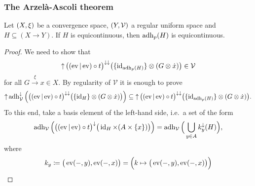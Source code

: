 \subsubsection{The Arzelà-Ascoli theorem}
\begin{lemma}
Let $\left( X,\xi \right)$ be a convergence space, $\left( Y, \mathcal{V} \right)$ a regular uniform space and $H \subseteq (X\to Y)$. If $H$ is equicontinuous, then $\operatorname{adh}_p(H)$ is equicontinuous.
\end{lemma}
\begin{proof}
We need to show that
\[ \operatorname{\uparrow}\big((\operatorname{ev}|\operatorname{ev})\circ t\big)^{\downarrow\downarrow}\big(\{\operatorname{id}_{\operatorname{adh}_p(H)}\}\otimes(G\otimes \dot{x})\big) \in \mathcal{V} \]
for all $G\overset{\xi}{\longrightarrow} x\in X$. By regularity of $\mathcal{V}$ it is enough to prove
\[ \operatorname{\uparrow}\operatorname{adh}_{\mathcal{V}}^\downarrow\Big(\big((\operatorname{ev}|\operatorname{ev})\circ t\big)^{\downarrow\downarrow}\big(\{\operatorname{id}_{H}\}\otimes(G\otimes \dot{x})\big)\Big) \subseteq \operatorname{\uparrow}\big((\operatorname{ev}|\operatorname{ev})\circ t\big)^{\downarrow\downarrow}\big(\{\operatorname{id}_{\operatorname{adh}_p(H)}\}\otimes(G\otimes \dot{x})\big). \]
To this end, take a basis element of the left-hand side, i.e.\ a set of the form
\[ \operatorname{adh}_\mathcal{V}\Big(\big((\operatorname{ev}|\operatorname{ev})\circ t\big)^{\downarrow}\big(\operatorname{id}_{H}\times(A\times \{x\})\big)\Big) = \operatorname{adh}_\mathcal{V}\Big(\bigcup_{y\in A}k_y^\downarrow(H)\Big), \]
where
\[ k_y \coloneqq \big(\operatorname{ev}(-,y), \operatorname{ev}(-,x)\big) = \Big(k\mapsto \big(\operatorname{ev}(-,y), \operatorname{ev}(-,x)\big)\Big) \]
\end{proof}

